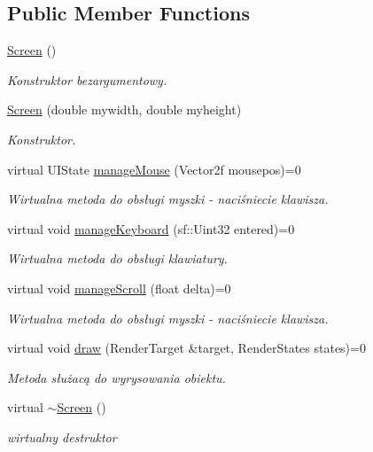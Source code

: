 \subsection*{Public Member Functions}
\begin{DoxyCompactItemize}
\item 
\mbox{\label{class_screen_ae7576476fc6e6a6eaa66389fdc41fe72}} 
\mbox{\hyperlink{class_screen_ae7576476fc6e6a6eaa66389fdc41fe72}{Screen}} ()
\begin{DoxyCompactList}\small\item\em Konstruktor bezargumentowy. \end{DoxyCompactList}\item 
\mbox{\hyperlink{class_screen_a1da1a362bfe70dad75bfc610af0fd001}{Screen}} (double mywidth, double myheight)
\begin{DoxyCompactList}\small\item\em Konstruktor. \end{DoxyCompactList}\item 
virtual U\+I\+State \mbox{\hyperlink{class_screen_aee89e0a473a855ddd0ae9cd38c5f2529}{manage\+Mouse}} (Vector2f mousepos)=0
\begin{DoxyCompactList}\small\item\em Wirtualna metoda do obsługi myszki -\/ naciśniecie klawisza. \end{DoxyCompactList}\item 
virtual void \mbox{\hyperlink{class_screen_a5b385381d2ba942567f4317e916c9951}{manage\+Keyboard}} (sf\+::\+Uint32 entered)=0
\begin{DoxyCompactList}\small\item\em Wirtualna metoda do obsługi klawiatury. \end{DoxyCompactList}\item 
virtual void \mbox{\hyperlink{class_screen_a039b9d63b0afafff7af22c26e2d81f5e}{manage\+Scroll}} (float delta)=0
\begin{DoxyCompactList}\small\item\em Wirtualna metoda do obsługi myszki -\/ naciśniecie klawisza. \end{DoxyCompactList}\item 
virtual void \mbox{\hyperlink{class_screen_ab9f74bb4bf0d0ee2a8280354ba0ff85e}{draw}} (Render\+Target \&target, Render\+States states)=0
\begin{DoxyCompactList}\small\item\em Metoda służacą do wyrysowania obiektu. \end{DoxyCompactList}\item 
\mbox{\label{class_screen_a4243bc17596af96415b09ac48205676d}} 
virtual \mbox{\hyperlink{class_screen_a4243bc17596af96415b09ac48205676d}{$\sim$\+Screen}} ()
\begin{DoxyCompactList}\small\item\em wirtualny destruktor \end{DoxyCompactList}\end{DoxyCompactItemize}
